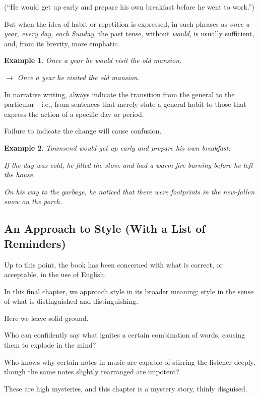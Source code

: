 \documentclass{article}
\newtheorem{example}{Example}
\begin{document}
\begin{enumerate}
	(``He would get up early and prepare his own breakfast before he went to work.'')
	
	But when the idea of habit or repetition is expressed, in such phrases as {\it once a year, every day, each Sunday}, the past tense, without {\it would}, is usually sufficient, and, from its brevity, more emphatic.
	\begin{example}
		Once a year he would visit the old mansion.
		
		$\to$ Once a year he visited the old mansion.
	\end{example}
	In narrative writing, always indicate the transition from the general to the particular - i.e., from sentences that merely state a general habit to those that express the action of a specific day or period.
	
	Failure to indicate the change will cause confusion.
	\begin{example}
		Townsend would get up early and prepare his own breakfast.
		
		If the day was cold, he filled the stove and had a warm fire burning before he left the house.
		
		On his way to the garbage, he noticed that there were footprints in the new-fallen snow on the porch.
	\end{example}
\end{enumerate}


\subsection{An Approach to Style (With a List of Reminders)}
Up to this point, the book has been concerned with what is correct, or acceptable, in the use of English.

In this final chapter, we approach style in its broader meaning: style in the sense of what is distinguished and distinguishing.

Here we leave solid ground.

Who can confidently say what ignites a certain combination of words, causing them to explode in the mind?

Who knows why certain notes in music are capable of stirring the listener deeply, though the same notes slightly rearranged are impotent?

These are high mysteries, and this chapter is a mystery story, thinly disguised.
\end{document}
